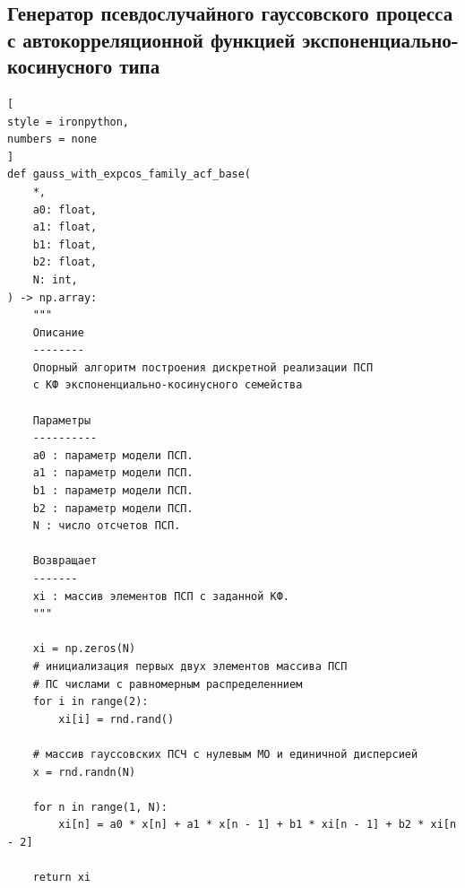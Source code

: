 \documentclass[
    11pt,
    a4paper,
    utf8,
]{article}
\begin{document}
\subsection{Генератор псевдослучайного гауссовского процесса с автокорреляционной функцией экспоненциально-косинусного типа}

\begin{lstlisting}[
style = ironpython,
numbers = none	
]
def gauss_with_expcos_family_acf_base(
	*,
	a0: float,
	a1: float,
	b1: float,
	b2: float,
	N: int,
) -> np.array:
	"""
	Описание
	--------
	Опорный алгоритм построения дискретной реализации ПСП
	с КФ экспоненциально-косинусного семейства
	
	Параметры
	----------
	a0 : параметр модели ПСП.
	a1 : параметр модели ПСП.
	b1 : параметр модели ПСП.
	b2 : параметр модели ПСП.
	N : число отсчетов ПСП.
	
	Возвращает
	-------
	xi : массив элементов ПСП с заданной КФ.
	"""
	
	xi = np.zeros(N)
	# инициализация первых двух элементов массива ПСП
	# ПС числами с равномерным распределеннием
	for i in range(2):
		xi[i] = rnd.rand()
	
	# массив гауссовских ПСЧ с нулевым МО и единичной дисперсией
	x = rnd.randn(N)
	
	for n in range(1, N):
		xi[n] = a0 * x[n] + a1 * x[n - 1] + b1 * xi[n - 1] + b2 * xi[n - 2]
	
	return xi
\end{lstlisting}


\begin{thebibliography}{99}
	
	
\end{thebibliography}
\end{document}
